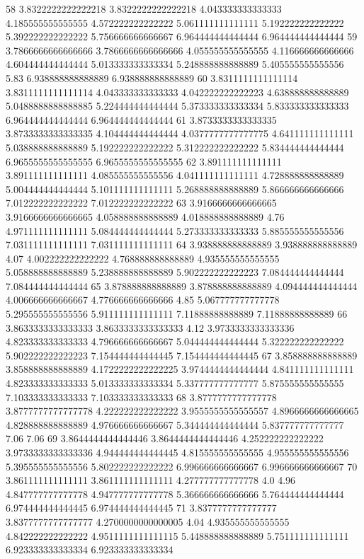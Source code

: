 58 3.8322222222222218 3.8322222222222218 4.043333333333333 4.185555555555555 4.572222222222222 5.061111111111111 5.192222222222222 5.392222222222222 5.756666666666667 6.964444444444444 6.964444444444444
59 3.7866666666666666 3.7866666666666666 4.055555555555555 4.116666666666666 4.604444444444444 5.013333333333334 5.248888888888889 5.405555555555556 5.83 6.938888888888889 6.938888888888889
60 3.8311111111111114 3.8311111111111114 4.043333333333333 4.042222222222223 4.638888888888889 5.0488888888888885 5.224444444444444 5.373333333333334 5.833333333333333 6.964444444444444 6.964444444444444
61 3.8733333333333335 3.8733333333333335 4.104444444444444 4.0377777777777775 4.641111111111111 5.038888888888889 5.192222222222222 5.312222222222222 5.834444444444444 6.9655555555555555 6.9655555555555555
62 3.891111111111111 3.891111111111111 4.085555555555556 4.041111111111111 4.728888888888889 5.004444444444444 5.101111111111111 5.268888888888889 5.866666666666666 7.012222222222222 7.012222222222222
63 3.9166666666666665 3.9166666666666665 4.058888888888889 4.018888888888889 4.76 4.971111111111111 5.084444444444444 5.273333333333333 5.885555555555556 7.031111111111111 7.031111111111111
64 3.938888888888889 3.938888888888889 4.07 4.002222222222222 4.768888888888889 4.935555555555555 5.058888888888889 5.238888888888889 5.902222222222223 7.084444444444444 7.084444444444444
65 3.878888888888889 3.878888888888889 4.094444444444444 4.006666666666667 4.776666666666666 4.85 5.067777777777778 5.295555555555556 5.911111111111111 7.11888888888889 7.11888888888889
66 3.8633333333333333 3.8633333333333333 4.12 3.9733333333333336 4.823333333333333 4.796666666666667 5.044444444444444 5.322222222222222 5.902222222222223 7.154444444444445 7.154444444444445
67 3.858888888888889 3.858888888888889 4.1722222222222225 3.9744444444444444 4.841111111111111 4.823333333333333 5.013333333333334 5.337777777777777 5.875555555555555 7.103333333333333 7.103333333333333
68 3.8777777777777778 3.8777777777777778 4.222222222222222 3.9555555555555557 4.8966666666666665 4.828888888888889 4.976666666666667 5.344444444444444 5.837777777777777 7.06 7.06
69 3.8644444444444446 3.8644444444444446 4.252222222222222 3.9733333333333336 4.944444444444445 4.815555555555555 4.955555555555556 5.395555555555556 5.802222222222222 6.996666666666667 6.996666666666667
70 3.861111111111111 3.861111111111111 4.277777777777778 4.0 4.96 4.847777777777778 4.947777777777778 5.366666666666666 5.764444444444444 6.974444444444445 6.974444444444445
71 3.8377777777777777 3.8377777777777777 4.2700000000000005 4.04 4.935555555555555 4.842222222222222 4.9511111111111115 5.448888888888889 5.751111111111111 6.923333333333334 6.923333333333334
